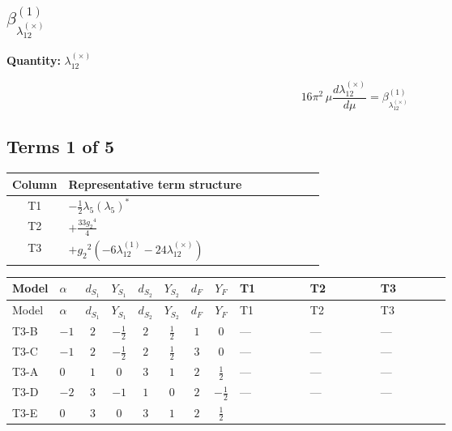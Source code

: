 \documentclass[8pt]{article}
\begin{document}
\begin{landscape}
\section*{$\beta_{\lambda_{12}^{(\times)}}^{(1)}$}
\noindent\textbf{Quantity: }$\lambda_{12}^{(\times)}$\par\smallskip
\[16\pi^2\,\mu\frac{d \lambda_{12}^{(\times)}}{d\mu}=\beta_{\lambda_{12}^{(\times)}}^{(1)}\]
\subsection*{Terms 1 of 5}
\begin{center}
\begin{tabular}{@{}c >{\raggedright\arraybackslash}p{0.82\linewidth}@{}}
\toprule
Column & Representative term structure \\
\midrule
T1 & \(\displaystyle -\frac{1}{2} {\lambda_5} \left({\lambda_5}\right)^{*}\) \\
\midrule
T2 & \(\displaystyle +\frac{33 {g_2}^4}{4}\) \\
\midrule
T3 & \(\displaystyle +{g_2}^2 (-6 {\lambda_{12}^{(1)}}-24 {\lambda_{12}^{(\times)}})\) \\
\midrule
\bottomrule
\end{tabular}
\end{center}
\smallskip
\tiny
\begin{longtable}{@{}llcccccc >{\raggedright\arraybackslash}p{0.21\linewidth} >{\raggedright\arraybackslash}p{0.21\linewidth} >{\raggedright\arraybackslash}p{0.21\linewidth}@{}}
\toprule
Model & $\alpha$ & $d_{S_1}$ & $Y_{S_1}$ & $d_{S_2}$ & $Y_{S_2}$ & $d_F$ & $Y_F$ & T1 & T2 & T3 \\
\midrule
\endfirsthead
\toprule
Model & $\alpha$ & $d_{S_1}$ & $Y_{S_1}$ & $d_{S_2}$ & $Y_{S_2}$ & $d_F$ & $Y_F$ & T1 & T2 & T3 \\
\midrule
\endhead
T3-B & $-1$ & $2$ & $-\frac{1}{2}$ & $2$ & $\frac{1}{2}$ & $1$ & $0$ & --- & --- & --- \\
\midrule
T3-C & $-1$ & $2$ & $-\frac{1}{2}$ & $2$ & $\frac{1}{2}$ & $3$ & $0$ & --- & --- & --- \\
\midrule
T3-A & $0$ & $1$ & $0$ & $3$ & $1$ & $2$ & $\frac{1}{2}$ & --- & --- & --- \\
\midrule
T3-D & $-2$ & $3$ & $-1$ & $1$ & $0$ & $2$ & $-\frac{1}{2}$ & --- & --- & --- \\
\midrule
T3-E & $0$ & $3$ & $0$ & $3$ & $1$ & $2$ & $\frac{1}{2}$ & \scriptsize\adjustbox{max width=\linewidth}{$\begin{gathered} -\frac{1}{2} {\lambda_5} \left({\lambda_5}\right)^{*}\end{gathered}$} & \scriptsize\adjustbox{max width=\linewidth}{$\begin{gathered} +\frac{33 {g_2}^4}{4}\end{gathered}$} & \scriptsize\adjustbox{max width=\linewidth}{$\begin{gathered} +{g_2}^2 (-6 {\lambda_{12}^{(1)}}-24 {\lambda_{12}^{(\times)}})\end{gathered}$} \\

\end{longtable}
\end{landscape}
\end{document}
